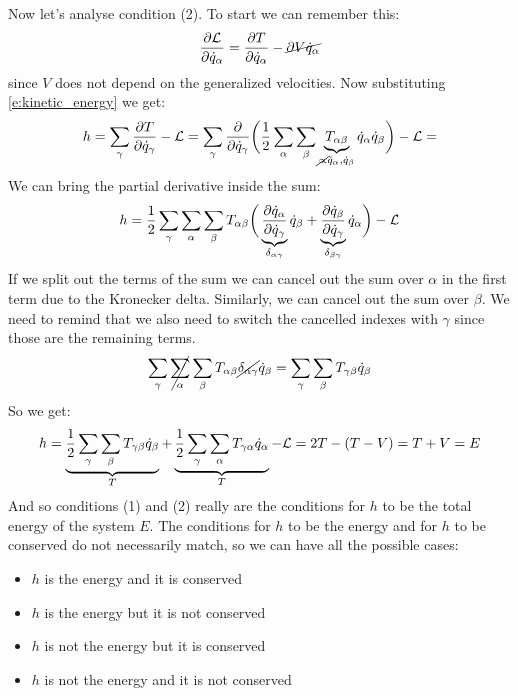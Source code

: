 Now let's analyse condition (2). To start we can remember this:
\begin{equation}
    \pdv{\lagr}{\dot{q}_{\alpha}} = \dfrac{\partial T}{\partial \dot{q}_{\alpha}} - \cancel{\partial{V}{\dot{q}_{\alpha}}}
\end{equation}
since $V$ does not depend on the generalized velocities. Now substituting \eqref{e:kinetic_energy} we get:
\begin{equation}
    h = \displaystyle\sum_{\gamma}\dfrac{\partial T}{\partial \dot{q}_{\gamma}} - \mathcal{L} = \displaystyle\sum_{\gamma}\dfrac{\partial}{\partial \dot{q}_{\gamma}}\bigg(\dfrac{1}{2}\displaystyle\sum_{\alpha}\displaystyle\sum_{\beta}\underbrace{T_{\alpha \beta}}_{\cancel{\propto} \dot{q}_{\alpha}, \dot{q}_{\beta}}\dot{q}_{\alpha}\dot{q}_{\beta}\bigg)  - \mathcal{L} =
\end{equation}
We can bring the partial derivative inside the sum:
\begin{equation}
    h = \dfrac{1}{2}\displaystyle\sum_{\gamma}\displaystyle\sum_{\alpha}\displaystyle\sum_{\beta}T_{\alpha \beta}\bigg(\underbrace{\dfrac{\partial \dot{q}_{\alpha}}{\partial \dot{q}_{\gamma}}}_{\delta_{\alpha \gamma}}\dot{q}_{\beta} + \underbrace{\dfrac{\partial \dot{q}_{\beta}}{\partial \dot{q}_{\gamma}}}_{\delta_{\beta \gamma}}\dot{q}_{\alpha}\bigg) - \mathcal{L}
\end{equation}
If we split out the terms of the sum we can cancel out the sum over $\alpha$ in the first term due to the Kronecker delta. Similarly, we can cancel out the sum over $\beta$. We need to remind that we also need to switch the cancelled indexes with $\gamma$ since those are the remaining terms.
\begin{equation}
    \displaystyle\sum_{\gamma}\cancel{\displaystyle\sum_{\alpha}}\displaystyle\sum_{\beta}T_{\alpha \beta }\cancel{\delta_{\alpha \gamma}}\dot{q}_{\beta} = \displaystyle\sum_{\gamma}\displaystyle\sum_{\beta}T_{\gamma \beta }\dot{q}_{\beta}
\end{equation}
So we get:
\begin{equation}
    h = \underbrace{\dfrac{1}{2}\displaystyle\sum_{\gamma}\displaystyle\sum_{\beta}T_{\gamma \beta }\dot{q}_{\beta}}_{T} + \underbrace{\dfrac{1}{2}\displaystyle\sum_{\gamma}\displaystyle\sum_{\alpha}T_{\gamma \alpha }\dot{q}_{\alpha}}_{T} - \mathcal{L} = 2T - (T-V) = T + V = E
\end{equation}
And so conditions (1) and (2) really are the conditions for $h$ to be the total energy of the system $E$. The conditions for $h$ to be the energy and for $h$ to be conserved do not necessarily match, so we can have all the possible cases:
\begin{itemize}
    \item $h$ is the energy and it is conserved
    \item $h$ is the energy but it is not conserved
    \item $h$ is not the energy but it is conserved
    \item $h$ is not the energy and it is not conserved
\end{itemize}
